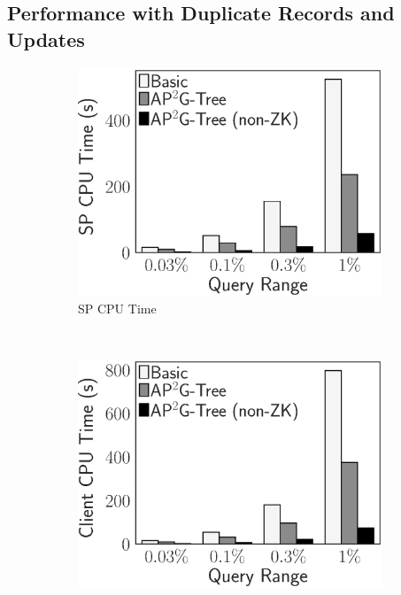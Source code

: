 \subsection{Performance with Duplicate Records and Updates}

\begin{figure}[t]
    \centering
    \begin{subfigure}{.33\linewidth}
        \includegraphics[height=\ht\figbox]{exp-figs/access-control/dup_sp.eps}
        \caption{SP CPU Time}
    \end{subfigure}~%
    \begin{subfigure}{.33\linewidth}
        \includegraphics[height=\ht\figbox]{exp-figs/access-control/dup_user.eps}

\end{subfigure}
\end{figure}
